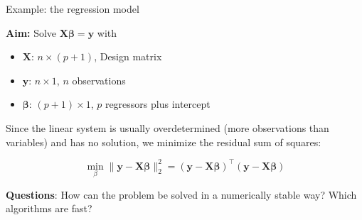\documentclass[11pt,compress,t,notes=noshow, xcolor=table]{beamer}
\begin{document}
\begin{vbframe}{Example: the regression model}

\textbf{Aim:} Solve $\bm{X}\boldsymbol{\beta} = \bm{y}$ with

\begin{itemize}
\item $\mathbf{X}$: $n \times (p + 1)$, Design matrix
\item $\mathbf{y}$: $n \times 1$, $n$ observations
\item $\boldsymbol{\beta}$: $(p + 1) \times 1$, $p$ regressors plus intercept
\end{itemize}

Since the linear system is usually overdetermined (more observations than variables) and has no solution, we minimize the residual sum of squares:

$$
\min_\beta \|\mathbf{y} - \mathbf{X}\boldsymbol{\beta}\|^2_2 = (\mathbf{y} - \mathbf{X}\boldsymbol{\beta})^\top
  (\mathbf{y} - \mathbf{X}\boldsymbol{\beta})
$$

\lz

\textbf{Questions}: How can the problem be solved in a numerically stable way? Which algorithms are fast?







\end{vbframe}
\end{document}
